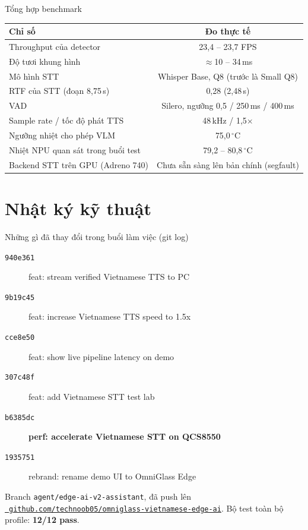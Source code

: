 \documentclass[aspectratio=169]{beamer}
\begin{document}
\begin{frame}{Tổng hợp benchmark}
  \centering
  \begin{tabular}{lc}
    \toprule
    \textbf{Chỉ số} & \textbf{Đo thực tế} \\
    \midrule
    Throughput của detector & 23,4 -- 23,7 FPS \\
    Độ tươi khung hình & $\approx$10 -- 34\,ms \\
    Mô hình STT & Whisper Base, Q8 (trước là Small Q8) \\
    RTF của STT (đoạn 8,75\,s) & 0,28 (2,48\,s) \\
    VAD & Silero, ngưỡng 0,5 / 250\,ms / 400\,ms \\
    Sample rate / tốc độ phát TTS & 48\,kHz / 1,5$\times$ \\
    Ngưỡng nhiệt cho phép VLM & 75,0\,$^\circ$C \\
    Nhiệt NPU quan sát trong buổi test & 79,2 -- 80,8\,$^\circ$C \\
    Backend STT trên GPU (Adreno 740) & Chưa sẵn sàng lên bản chính (segfault) \\
    \bottomrule
  \end{tabular}
\end{frame}

\section{Nhật ký kỹ thuật}

\begin{frame}{Những gì đã thay đổi trong buổi làm việc (git log)}
  \small
  \begin{description}
    \item[\texttt{940e361}] feat: stream verified Vietnamese TTS to PC
    \item[\texttt{9b19c45}] feat: increase Vietnamese TTS speed to 1.5x
    \item[\texttt{cce8e50}] feat: show live pipeline latency on demo
    \item[\texttt{307c48f}] feat: add Vietnamese STT test lab
    \item[\texttt{b6385dc}] \textbf{perf: accelerate Vietnamese STT on QCS8550}
    \item[\texttt{1935751}] rebrand: rename demo UI to OmniGlass Edge
  \end{description}
  \vspace{6pt}
  Branch \texttt{agent/edge-ai-v2-assistant}, đã push lên
  \href{https://github.com/technoob05/omniglass-vietnamese-edge-ai}{\faGithub\ \texttt{github.com/technoob05/omniglass-vietnamese-edge-ai}}.
  Bộ test toàn bộ profile: \textbf{12/12 pass}.
\end{frame}
\end{document}
